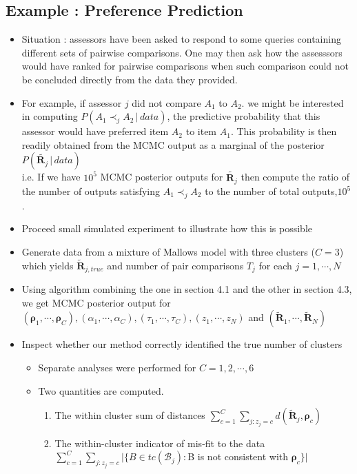 \documentclass[12pt]{article}
\begin{document}
\subsection{Example : Preference Prediction}
\begin{itemize}
    \item Situation : assessors have been asked to respond to some queries containing different sets of pairwise comparisons. One may then ask how the assesssors would have ranked for pairwise comparisons when such comparison could not be concluded directly from the data they provided. 
    \item For example, if assessor $j$ did not compare $A_1$ to $A_2$. we might be interested in computing $P(A_1\prec_j A_2 \,|\, data)$, the predictive probability that this assessor would have preferred item $A_2$ to item $A_1$. This probability is then readily obtained from the MCMC output as a marginal of the posterior $P(\tilde{\mathbf{R}_j}\,|\,data)$ \\ i.e. If we have $10^5$ MCMC posterior outputs for $\tilde{\mathbf{R}_j}$ then compute the ratio of the number of outputs satisfying $A_1\prec_j A_2$ to the number of total outputs,$10^5$. 
    \item Proceed small simulated experiment to illustrate how this is possible
    \item Generate data from a mixture of Mallows model with three clusters ($C=3$) which yields $\tilde{\mathbf{R}}_{j,true}$ and number of pair comparisons $T_j$ for each $j=1, \cdots, N$
    \item Using algorithm combining the one in section 4.1 and the other in section 4.3, we get MCMC posterior output for $(\boldsymbol{\rho}_1, \cdots, \boldsymbol{\rho}_C), (\alpha_1, \cdots, \alpha_C), (\tau_1, \cdots, \tau_C), (z_1, \cdots, z_N)$ and $(\tilde{\mathbf{R}}_1, \cdots, \tilde{\mathbf{R}}_N)$
    \item Inspect whether our method correctly identified the true number of clusters
    \begin{itemize}
        \item Separate analyses were performed for $C=1,2,\cdots, 6$
        \item Two quantities are computed.
        \begin{enumerate}
            \item The within cluster sum of distances $\sum_{c=1}^C \sum_{j : z_j=c} d(\tilde{\mathbf{R}}_j, \boldsymbol{\rho}_c)$
            \item The within-cluster indicator of mis-fit to the data \\$\sum_{c=1}^C \sum_{j : z_j=c} \big|\{B\in tc(\mathcal{B}_j):$B is not consistent with $\boldsymbol{\rho}_c\} \big|$

\end{enumerate}
\end{itemize}
\end{itemize}
\end{document}
